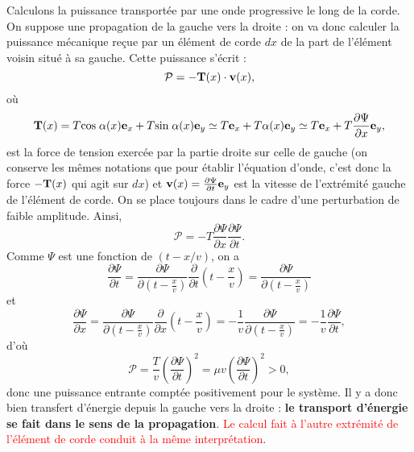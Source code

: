 \documentclass[11pt,a4paper]{report}
\begin{document}
Calculons la puissance transportée par une onde progressive le long de la corde. On suppose une propagation de la gauche vers la droite : on va donc calculer la puissance mécanique reçue par un élément de corde $dx$ de la part de l'élément voisin situé à sa gauche. Cette puissance s'écrit :
\begin{equation}
	\mathcal{P} = -\bold{T}(x)\cdot\bold{v}(x),
\end{equation}
où
\begin{equation}
	\bold{T}(x) = T \text{cos}\;\alpha(x)\bold{e}_x  + T \text{sin}\;\alpha(x)\bold{e}_y \simeq T \bold{e}_x  + T \alpha(x)\bold{e}_y 
	\simeq T \bold{e}_x  + T \frac{\partial \Psi}{\partial x}\bold{e}_y,
\end{equation}
est la force de tension exercée par la partie droite sur celle de gauche (on conserve les mêmes notations que pour établir l'équation d'onde, c'est donc la force $-\bold{T}(x)$ qui agit sur $dx$) et $\bold{v}(x) = \frac{\partial \Psi}{\partial t}\bold{e}_y$ est la vitesse de l'extrémité gauche de l'élément de corde. On se place toujours dans le cadre d'une perturbation de faible amplitude. Ainsi,
\begin{equation}
	\mathcal{P} = -T \frac{\partial \Psi}{\partial x}\frac{\partial \Psi}{\partial t}.
\end{equation}
Comme $\Psi$ est une fonction de $(t-x/v)$, on a
\begin{equation}
	\frac{\partial \Psi}{\partial t} = \frac{\partial \Psi}{\partial\left(t-\frac{x}{v}\right)}\frac{\partial}{\partial t}\left(t-\frac{x}{v}\right) 
	= \frac{\partial \Psi}{\partial\left(t-\frac{x}{v}\right)}
\end{equation}
et 
\begin{equation}
	\frac{\partial \Psi}{\partial x} =  \frac{\partial \Psi}{\partial\left(t-\frac{x}{v}\right)}\frac{\partial}{\partial x}\left(t-\frac{x}{v}\right) 
	= -\frac{1}{v}\frac{\partial \Psi}{\partial\left(t-\frac{x}{v}\right)} = -\frac{1}{v}\frac{\partial \Psi}{\partial t},
\end{equation}
d'où
\begin{equation}
	\mathcal{P} = \frac{T}{v} \left(\frac{\partial \Psi}{\partial t}\right)^2 = \mu v \left(\frac{\partial \Psi}{\partial t}\right)^2 > 0,
\end{equation}
donc une puissance entrante comptée positivement pour le système. Il y a donc bien transfert d'énergie depuis la gauche vers la droite : \textbf{le transport d'énergie se fait dans le sens de la propagation}. \textcolor{red}{Le calcul fait à l'autre extrémité de l'élément de corde conduit à la même interprétation}.\\
\end{document}
